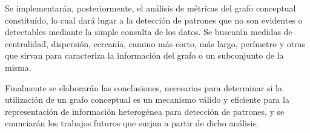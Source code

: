 	Se implementarán, posteriormente, el análisis de métricas del grafo conceptual constituído, lo cual dará lugar a la detección de patrones que no son evidentes o detectables mediante la simple consulta de los datos. Se buscarán medidas de centralidad, dispersión, cercanía, camino más corto, más largo, perímetro y otras que sirvan para caracteriza la información del grafo o un subconjunto de la misma.
	
	Finalmente se elaborarán las conclusiones, necesarias para determinar si la utilización de un grafo conceptual es un mecanismo válido y eficiente para la representación de información heterogénea para detección de patrones, y se enunciarán los trabajos futuros que surjan a partir de dicho análisis.

